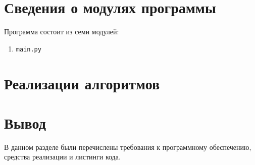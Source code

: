 \section{Сведения о модулях программы}

Программа состоит из семи модулей: 

\begin{enumerate}[label={\arabic*)}]
	\item \texttt{main.py} %
\end{enumerate}

\section{Реализации алгоритмов}

%

\section*{Вывод}

В данном разделе были перечислены требования к программному обеспечению, средства реализации и листинги кода.

    